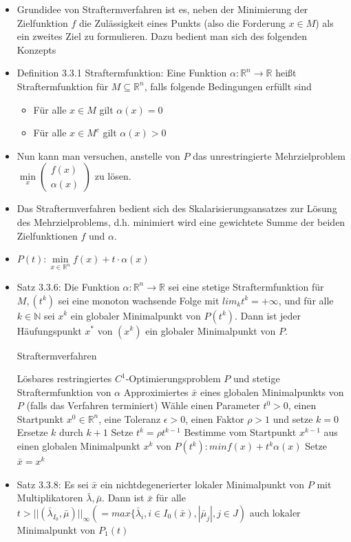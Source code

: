 \documentclass[paper=a4, fontsize=11pt]{scrartcl} %
\numberwithin{equation}{section} %
\numberwithin{figure}{section} %
\numberwithin{table}{section} %
\begin{document}
\begin{itemize}
  \item Grundidee von Straftermverfahren ist es, neben der Minimierung der Zielfunktion $f$ die Zulässigkeit eines Punkts (also die Forderung $x \in M$) als ein zweites Ziel zu formulieren. Dazu bedient man sich des folgenden Konzepts
  \item Definition 3.3.1 Straftermfunktion: Eine Funktion $\alpha: \mathbb{R}^n \rightarrow \mathbb{R}$ heißt Straftermfunktion für $M \subseteq \mathbb{R}^n$, falls folgende Bedingungen erfüllt sind
  \begin{itemize}
    \item Für alle $x \in M$ gilt $\alpha(x) = 0$
    \item Für alle $x \in M^c$ gilt $\alpha(x) > 0$
  \end{itemize}
  \item Nun kann man versuchen, anstelle von $P$ das unrestringierte Mehrzielproblem $\min\limits_x \begin{pmatrix} f(x) \\ \alpha(x)\end{pmatrix}$ zu lösen.
  \item Das Straftermverfahren bedient sich des Skalarisierungsansatzes zur Lösung des Mehrzielproblems, d.h. minimiert wird eine gewichtete Summe der beiden Zielfunktionen $f$ und $\alpha$.
  \item $P(t): \min\limits_{x \in \mathbb{R}^n} f(x) + t \cdot \alpha(x)$
  \item Satz 3.3.6: Die Funktion $\alpha : \mathbb{R}^n \rightarrow \mathbb{R}$ sei eine stetige Straftermfunktion für $M, (t^k)$ sei eine monoton wachsende Folge mit $lim_k t^k = + \infty$, und für alle $k \in \mathbb{N}$ sei $x^k$ ein globaler Minimalpunkt von $P(t^k)$. Dann ist jeder Häufungspunkt $x^*$ von $(x^k)$ ein globaler Minimalpunkt von $P$.
  \begin{algorithm}
  \caption{Straftermverfahren}
  \begin{algorithmic}[1]
    \Require Lösbares restringiertes $C^1$-Optimierungsproblem $P$ und stetige Straftermfunktion von $\alpha$
    \Ensure Approximiertes $\bar{x}$ eines globalen Minimalpunkts von $P$ (falls das Verfahren terminiert)
    \State Wähle einen Parameter $t^0 > 0$, einen Startpunkt $x^0 \in \mathbb{R}^n$, eine Toleranz $\epsilon > 0$, einen Faktor $\rho > 1$ und setze $k = 0$
    \Repeat
    \State Ersetze $k$ durch $k+1$
    \State Setze $t^k = \rho t^{k-1}$
    \State Bestimme vom Startpunkt $x^{k-1}$ aus einen globalen Minimalpunkt $x^k$ von $P(t^k): min f(x) + t^k \alpha(x)$
    \State Setze $\bar{x} = x^k$
  \end{algorithmic}
  \end{algorithm}
  \item Satz 3.3.8: Es sei $\bar{x}$ ein nichtdegenerierter lokaler Minimalpunkt von $P$ mit Multiplikatoren $\bar{\lambda},\bar{\mu}$. Dann ist $\bar{x}$ für alle $t > ||(\bar{\lambda}_{I_0}, \bar{\mu})||_\infty (= max \{ \bar{\lambda}_i, i \in I_0(\bar{x}),|\bar{\mu}_j|, j \in J)$ auch lokaler Minimalpunkt von $P_1(t)$
\end{itemize}
\end{document}
